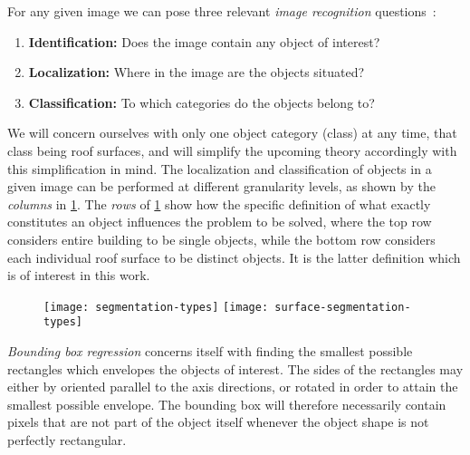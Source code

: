 For any given image we can pose three relevant \textit{image recognition} questions~\cite{image_recognition}:
%
\begin{enumerate}[]
  \item \textbf{Identification:} Does the image contain any object of interest?
  \item \textbf{Localization:} Where in the image are the objects situated?
  \item \textbf{Classification:} To which categories do the objects belong to?
\end{enumerate}
%
We will concern ourselves with only one object category (class) at any time, that class being roof surfaces, and will simplify the upcoming theory accordingly with this simplification in mind.
The localization and classification of objects in a given image can be performed at different granularity levels, as shown by the \emph{columns} in \cref{fig:segmentation-types}.
The \emph{rows} of \cref{fig:segmentation-types} show how the specific definition of what exactly constitutes an object influences the problem to be solved, where the top row considers entire building to be single objects, while the bottom row considers each individual roof surface to be distinct objects.
It is the latter definition which is of interest in this work.

\begin{figure}[t]
  \texttt{[image: segmentation-types]}
  \texttt{[image: surface-segmentation-types]}
  \label{fig:segmentation-types}
\end{figure}

\textit{Bounding box regression} concerns itself with finding the smallest possible rectangles which envelopes the objects of interest.
The sides of the rectangles may either by oriented parallel to the axis directions, or rotated in order to attain the smallest possible envelope.
The bounding box will therefore necessarily contain pixels that are not part of the object itself whenever the object shape is not perfectly rectangular.

